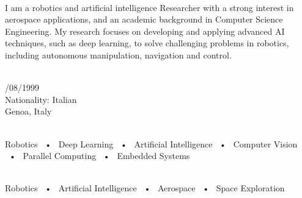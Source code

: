 \documentclass[pastel]{simplehipstercv}
\begin{document}
\begin{paracol}{2}

\begin{leftcolumn}

\footnotesize
{
\raggedleft
\color{black}
\\[0.5em]
I am a robotics and artificial intelligence Researcher with a strong interest in aerospace applications, and an academic background in Computer Science Engineering. My research focuses on developing and applying advanced AI techniques, such as deep learning, to solve challenging problems in robotics, including autonomous manipulation, navigation and control.
\bigskip

 \\[0.3em]
\faBirthdayCake {}/08/1999 \\
\vspace{0.2em}
\faGlobe \; Nationality: Italian \\
\vspace{0.2em}
\faMapMarker \; Genoa, Italy \\

\bigskip

 \\[0.5em]

Robotics ~•~ Deep Learning ~•~ Artificial Intelligence ~•~ Computer Vision ~•~ Parallel Computing  ~•~ Embedded Systems  

\medskip

\\[0.5em]

Robotics ~•~ Artificial Intelligence ~•~ Aerospace ~•~ Space Exploration 

\medskip

\\[0.5em]


\bigskip

\\[0.5em]

}
\end{leftcolumn}
\end{paracol}
\end{document}
